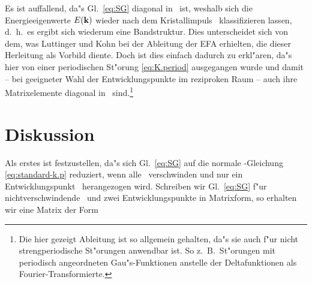 Es ist auffallend, da"s Gl.~\eqref{eq:SG} diagonal in \nk\ ist, weshalb sich
die Energieeigenwerte $E(\mathbf{k})$ wieder nach dem Kristallimpuls \nk\ 
klassifizieren lassen, d.~h.\ es ergibt sich wiederum eine Bandstruktur. Dies
unterscheidet sich von dem, was Luttinger und Kohn \cite{luko:55} bei der
Ableitung der EFA erhielten, die dieser Herleitung als Vorbild diente. Doch
ist dies einfach dadurch zu erkl"aren, da"s hier von einer periodischen
St"orung \eqref{eq:K.period} ausgegangen wurde und damit -- bei geeigneter
Wahl der Entwicklungspunkte im reziproken Raum -- auch ihre Matrixelemente
diagonal in \nk\ sind.\footnote{Die hier gezeigt Ableitung ist so allgemein
  gehalten, da"s sie auch f"ur nicht strengperiodische St"orungen anwendbar
  ist. So z.~B.\ St"orungen mit periodisch angeordneten Gau"s-Funktionen
  anstelle der Deltafunktionen als Fourier-Transformierte.}

\section{Diskussion}
\label{sec:disk}

Als erstes ist festzustellen, da"s sich Gl.~\eqref{eq:SG} auf die
normale \kdotp-Gleichung \eqref{eq:standard-k.p} reduziert, wenn alle \VnnKK\ 
verschwinden und nur ein Entwicklungspunkt \set\ herangezogen wird. Schreiben
wir Gl.~\eqref{eq:SG} f"ur nichtverschwindende \VnnKK\ und zwei
Entwicklungspunkte in Matrixform, so erhalten wir eine Matrix der Form

